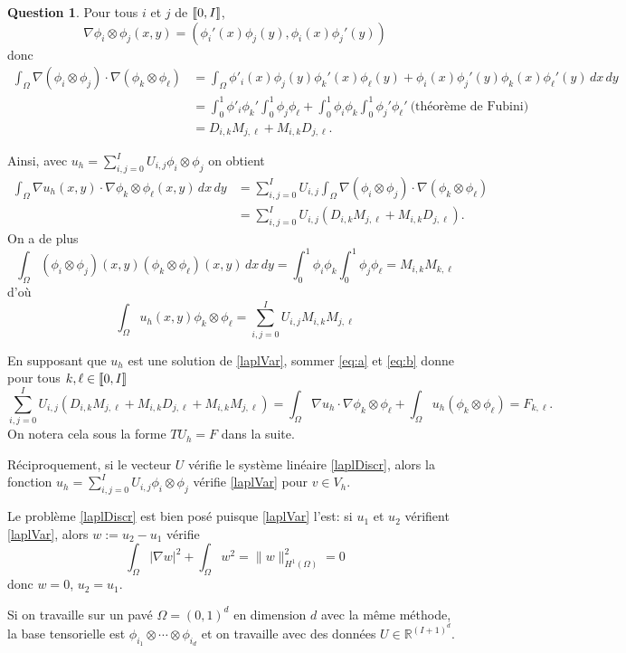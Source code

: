 \documentclass[11pt]{article}
\newcommand{\RR}{\mathbb{R}}
\DeclarePairedDelimiter{\zintcc}{[\![}{]\!]}
\theoremstyle{definition}
\newtheorem{ques}{Question}
\theoremstyle{plain}
\begin{document}
\begin{ques}
Pour tous $i$ et $j$ de $\zintcc{0,I}$,
\[
\nabla \phi_i\otimes\phi_j (x,y) = \left(
\phi_i'(x)\phi_j(y), \phi_i(x)\phi_j'(y)
\right)
\]
donc 
\begin{align*}
\int_{\Omega}\nabla(\phi_i\otimes\phi_j)\cdot\nabla(\phi_k\otimes\phi_\ell) 
&=
\int_{\Omega} \phi'_i(x)\phi_j(y)\phi_k'(x)\phi_\ell(y) + \phi_i(x)\phi_j'(y)\phi_k(x)\phi_\ell'(y)\,dx\,dy \\
&= \int_{0}^{1}\phi'_i\phi_k' \int_0^1\phi_j\phi_\ell + \int_{0}^{1}\phi_i\phi_k \int_0^1\phi_j'\phi_\ell' \ \text{(théorème de Fubini)} \\
&= D_{i,k}M_{j,\ell} + M_{i,k}D_{j,\ell}.
\end{align*}

Ainsi, avec $u_h = \sum_{i,j=0}^{I}U_{i,j}\phi_i\otimes\phi_j$ on obtient
\begin{align*}\tag{a}\label{eq:a}
\int_{\Omega} \nabla u_h(x,y)\cdot \nabla \phi_k\otimes\phi_\ell (x,y)\,dx\,dy 
&= \sum_{i,j=0}^{I}U_{i,j} \int_\Omega\nabla(\phi_i\otimes\phi_j)\cdot\nabla(\phi_k\otimes\phi_\ell) \\
&= \sum_{i,j=0}^{I}U_{i,j} (D_{i,k}M_{j,\ell}+M_{i,k}D_{j,\ell}).
\end{align*}
On a de plus
\[
\int_\Omega (\phi_i\otimes\phi_j)(x,y)(\phi_k\otimes\phi_\ell)(x,y)\,dx\,dy = \int_0^1 \phi_i \phi_k \int_0^1 \phi_j \phi_\ell = M_{i,k}M_{k,\ell}
\]
d'où
\begin{equation}\tag{b}\label{eq:b}
\int_\Omega u_h(x,y)\phi_k\otimes\phi_\ell = \sum_{i,j=0}^{I}U_{i,j}M_{i,k}M_{j,\ell}
\end{equation}

En supposant que $u_h$ est une solution de \eqref{laplVar}, sommer \eqref{eq:a} et \eqref{eq:b} donne pour tous $k,\ell\in\zintcc{0,I}$
\begin{equation}\label{laplDiscr}
\sum_{i,j=0}^{I}U_{i,j}(D_{i,k}M_{j,\ell} + M_{i,k}D_{j,\ell} + M_{i,k}M_{j,\ell}) =
\int_\Omega\nabla u_h\cdot \nabla\phi_k\otimes\phi_\ell + \int_\Omega u_h (\phi_k\otimes\phi_\ell)
= F_{k,\ell}.
\end{equation}
On notera cela sous la forme $TU_h = F$ dans la suite.

Réciproquement, si le vecteur $U$ vérifie le système linéaire \eqref{laplDiscr}, alors la fonction $u_h = \sum_{i,j=0}^{I}U_{i,j}\phi_i\otimes\phi_j$ vérifie \eqref{laplVar} pour $v\in V_h$.

Le problème \eqref{laplDiscr} est bien posé puisque \eqref{laplVar} l'est: si $u_1$ et $u_2$ vérifient \eqref{laplVar}, alors $w:= u_2-u_1$ vérifie
\[
\int_\Omega \left|\nabla w\right|^2 + \int_\Omega w^2 = \|w\|_{H^1(\Omega)}^2 = 0
\]
donc $w = 0$, $u_2 = u_1$.

Si on travaille sur un pavé $\Omega = (0,1)^d$ en dimension $d$ avec la même méthode, la base tensorielle est $\phi_{i_1}\otimes\cdots\otimes\phi_{i_d}$ et on travaille avec des données $U \in \RR^{(I+1)^d}$.

\end{ques}
\end{document}
